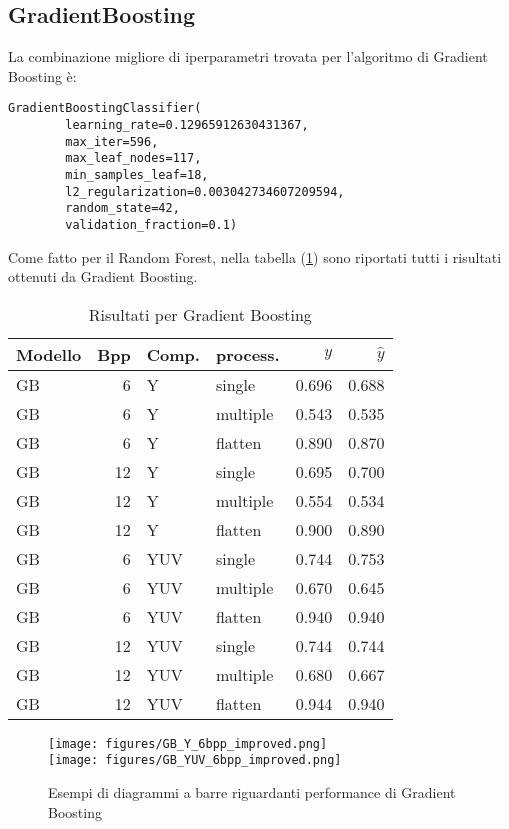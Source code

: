 \subsection{GradientBoosting}
La combinazione migliore di iperparametri trovata per l'algoritmo di Gradient Boosting è:
\begin{lstlisting}[style=pythonElegant]
    GradientBoostingClassifier(
        learning_rate=0.12965912630431367,
        max_iter=596,
        max_leaf_nodes=117,
        min_samples_leaf=18,
        l2_regularization=0.003042734607209594,
        random_state=42,
        validation_fraction=0.1)
\end{lstlisting}
Come fatto per il Random Forest, nella tabella (\ref{tab:GB-results-table}) sono riportati tutti i risultati ottenuti da Gradient Boosting.
\begin{table}[H]
\centering
\caption{Risultati per Gradient Boosting}
\label{tab:GB-results-table}
\begin{tabular}{lrllrr}
\toprule
Modello &  Bpp &  Comp. &     process. &     $y$ &  $\hat{y}$ \\
\midrule
GB &  6 &       Y &   single & 0.696 &  0.688 \\
GB &  6 &       Y & multiple & 0.543 &  0.535 \\
GB &  6 &       Y & flatten & 0.890 & 0.870 \\
GB & 12 &       Y &   single & 0.695 &  0.700 \\
GB & 12 &       Y & multiple & 0.554 &  0.534 \\
GB & 12 &       Y & flatten & 0.900 & 0.890 \\
\midrule
GB &  6 &     YUV &   single & 0.744 &  0.753 \\
GB &  6 &     YUV & multiple & 0.670 &  0.645 \\
GB &  6 &     YUV &  flatten & 0.940 &  0.940 \\
GB & 12 &     YUV &   single & 0.744 &  0.744 \\
GB & 12 &     YUV & multiple & 0.680 &  0.667 \\
GB & 12 &     YUV &  flatten & 0.944 &  0.940 \\
\bottomrule
\end{tabular}
\end{table}
\begin{figure}[H]
    \centering
    \texttt{[image: figures/GB\_Y\_6bpp\_improved.png]}\\[0.5cm]
    \texttt{[image: figures/GB\_YUV\_6bpp\_improved.png]}
    \caption{Esempi di diagrammi a barre riguardanti performance di Gradient Boosting}
    \label{fig:GB_YUV_plots}
\end{figure}
